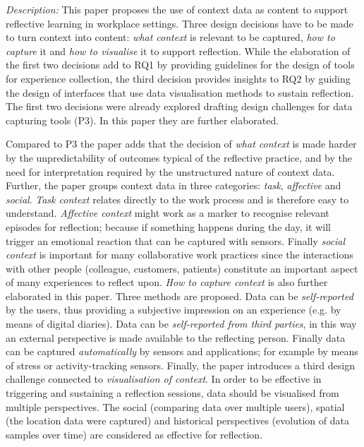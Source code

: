 \emph{Description:} This paper proposes the use of context data as content to support reflective learning in workplace settings. Three design decisions have to be made to turn context into content: \emph{what context} is relevant to be captured, \emph{how to capture} it and \emph{how to visualise} it to support reflection. While the elaboration of the first two decisions add to RQ1 by providing guidelines for the design of tools for experience collection, the third decision provides insights to RQ2 by guiding the design of interfaces that use data visualisation methods to sustain reflection. The first two decisions were already explored drafting design challenges for data capturing tools (P3). In this paper they are further elaborated.

Compared to P3 the paper adds that the decision of \emph{what context} is made harder by the unpredictability of outcomes typical of the reflective practice, and by the need for interpretation required by the unstructured nature of context data. Further, the paper groups context data in three categories: \emph{task}, \emph{affective} and \emph{social}. \emph{Task context} relates directly to the work process and is therefore easy to understand. \emph{Affective context} might work as a marker to recognise relevant episodes for reflection; because if something happens during the day, it will trigger an emotional reaction that can be captured with sensors. Finally \emph{social context} is important for many collaborative work practices since the interactions with other people (colleague, customers, patients) constitute an important aspect of many experiences to reflect upon. \emph{How to capture context} is also further elaborated in this paper. Three methods are proposed. Data can be \emph{self-reported} by the users, thus providing a subjective impression on an experience (e.g. by means of digital diaries). Data can be \emph{self-reported from third parties}, in this way an external perspective is made available to the reflecting person. Finally data can be captured \emph{automatically} by sensors and applications; for example by means of stress or activity-tracking sensors. Finally, the paper introduces a third design challenge connected to \emph{visualisation of context}. In order to be effective in triggering and sustaining a reflection sessions, data should be visualised from multiple perspectives. The social (comparing data over multiple users), spatial (the location data were captured) and historical perspectives (evolution of data samples over time) are considered as effective for reflection. 


